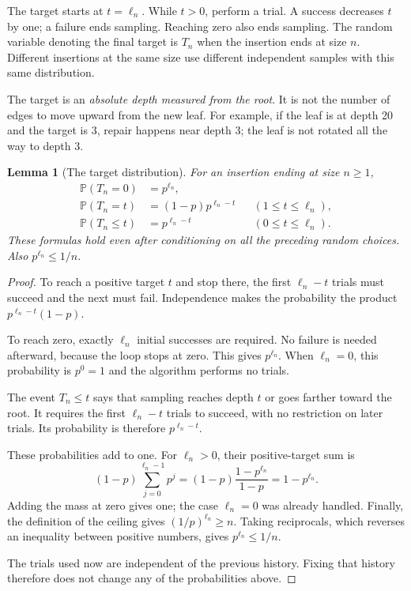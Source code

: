 \documentclass[11pt,a4paper]{article}
\theoremstyle{readable}
\newtheorem{lemma}[theorem]{Lemma}
\newcommand{\Prob}{\mathbb P}
\begin{document}
The target starts at $t=\ell_n$. While $t>0$, perform a trial. A success
decreases $t$ by one; a failure ends sampling. Reaching zero also ends
sampling. The random variable denoting the final target is $T_n$ when
the insertion ends at size $n$. Different insertions at the same size
use different independent samples with this same distribution.

The target is an \emph{absolute depth measured from the root}. It is
not the number of edges to move upward from the new leaf. For example,
if the leaf is at depth 20 and the target is 3, repair happens near
depth 3; the leaf is not rotated all the way to depth 3.

\begin{lemma}[The target distribution]
\label{lem:target}
For an insertion ending at size $n\ge1$,
\begin{align}
  \Prob(T_n=0)&=p^{\ell_n}, \label{eq:target-zero}\\
  \Prob(T_n=t)&=(1-p)p^{\ell_n-t}
        &&(1\le t\le\ell_n), \label{eq:target-mass}\\
  \Prob(T_n\le t)&=p^{\ell_n-t}
        &&(0\le t\le\ell_n). \label{eq:target-cdf}
\end{align}
These formulas hold even after conditioning on all the preceding random
choices. Also $p^{\ell_n}\le1/n$.
\end{lemma}

\begin{proof}
To reach a positive target $t$ and stop there, the first $\ell_n-t$
trials must succeed and the next must fail. Independence makes the
probability the product $p^{\ell_n-t}(1-p)$.

To reach zero, exactly $\ell_n$ initial successes are required. No
failure is needed afterward, because the loop stops at zero. This gives
$p^{\ell_n}$. When $\ell_n=0$, this probability is $p^0=1$ and the
algorithm performs no trials.

The event $T_n\le t$ says that sampling reaches depth $t$ or goes
farther toward the root. It requires the first $\ell_n-t$ trials to
succeed, with no restriction on later trials. Its probability is
therefore $p^{\ell_n-t}$.

These probabilities add to one. For $\ell_n>0$, their positive-target
sum is
\[
 (1-p)\sum_{j=0}^{\ell_n-1}p^j
   =(1-p)\frac{1-p^{\ell_n}}{1-p}=1-p^{\ell_n}.
\]
Adding the mass at zero gives one; the case $\ell_n=0$ was already
handled. Finally, the definition of the ceiling gives
$(1/p)^{\ell_n}\ge n$. Taking reciprocals, which reverses an inequality
between positive numbers, gives $p^{\ell_n}\le1/n$.

The trials used now are independent of the previous history. Fixing
that history therefore does not change any of the probabilities above.
\end{proof}
\end{document}

